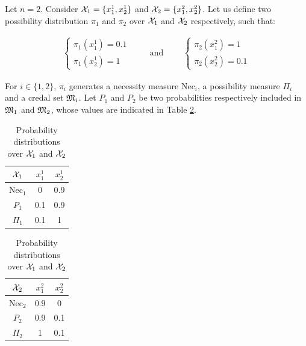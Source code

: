 \begin{example}\label{ex:necessity}
    Let $n=2$. Consider ${\mathcal{X}}_1=\{x^1_1, x^1_2\}$ and ${\mathcal{X}}_2=\{x^2_1, x^2_2\}$. Let us define two possibility distribution $\pi_1$ and $\pi_2$ over ${\mathcal{X}}_1$ and ${\mathcal{X}}_2$ respectively, such that:

    \begin{eqnarray*}
    \begin{cases}
        \pi_1(x^1_1) = 0.1\\
        \pi_1(x^1_2) = 1
    \end{cases}
    \qquad\text{ and }\qquad
    \begin{cases}
        \pi_2(x^2_1)=1\\
        \pi_2(x^2_2)=0.1
    \end{cases}
    \end{eqnarray*}
    
    For $i\in\{1,2\}$, $\pi_i$ generates a necessity measure $\mathrm{Nec}_i$, a possibility measure $\Pi_i$ and a credal set ${\mathfrak{M}}_i$. Let $P_1$ and $P_2$ be two probabilities respectively included in ${\mathfrak{M}}_1$ and ${\mathfrak{M}}_2$,  whose values are indicated in Table \ref{tab:proba_distrib_1}. 
    
    \begin{table}[!ht]
        \centering
        \begin{tabular}{|c|c|c|}
            \hline
            ${\mathcal{X}}_1$ & $x^1_1$ & $x^1_2$\\
            \hline\hline
            $\mathrm{Nec}_1$ & 0 & 0.9\\
            \hline
            $P_1$  & 0.1 & 0.9\\
            \hline
            $\Pi_1$ & 0.1 & 1\\
            \hline
        \end{tabular}
        \quad
        \begin{tabular}{|c|c|c|}
            \hline
            ${\mathcal{X}}_2$ & $x^2_1$ & $x^2_2$\\
            \hline\hline
            $\mathrm{Nec}_2$ & 0.9 & 0\\
            \hline
            $P_2$  & 0.9 & 0.1\\
            \hline
            $\Pi_2$ & 1 & 0.1\\
            \hline
        \end{tabular}
        \caption{Probability distributions over ${\mathcal{X}}_1$ and ${\mathcal{X}}_2$}
        \label{tab:proba_distrib_1}
    \end{table}
    

\end{example}

